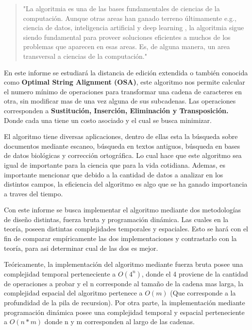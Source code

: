 

\begin{quote}
"La algoritmia es una de las
bases fundamentales de ciencias de la computación. Aunque otras areas
han ganado terreno últimamente e.g., ciencia de datos, inteligencia
artificial y deep learning , la algoritmia sigue siendo fundamental para
proveer soluciones eficientes a muchos de los problemas que aparecen
en esas areas. Es, de alguna manera, un area transversal a ciencias de
la computación."  \cite{algoritmos_discretos}
\end{quote}

En este informe se estudiará la distancia de edición 
extendida o también conocida como
\textbf{Optimal String Alignment (OSA)}, este algoritmo nos permite
calcular el numero mínimo de operaciones para transformar una cadena
de caracteres en otra, sin modificar mas de una vez alguna de sus subcadenas. Las operaciones corresponden a \textbf{Sustitución,
Inserción, Eliminación y Transposición.} Donde cada una tiene un costo
asociado y el cual se busca minimizar.

El algoritmo tiene diversas aplicaciones, dentro de ellas esta
la búsqueda sobre documentos mediante escaneo, búsqueda en textos antiguos,
búsqueda en bases de datos biológicas y corrección ortográfica. Lo cual
hace que este algoritmo sea igual de importante para la ciencia que para
la vida cotidiana. Ademas, es importante mencionar que debido a la cantidad
de datos a analizar en los distintos campos, la eficiencia del algoritmo
es algo que se ha ganado importancia a traves del tiempo.
\cite{algoritmos_discretos}

Con este informe se busca implementar el algoritmo mediante dos metodologías
de diseño distintas, fuerza bruta y programación dinámica. Las cuales en la
teoría, poseen distintas complejidades temporales y espaciales. Esto se hará
con el fin de comparar empíricamente las dos implementaciones y 
contrastarlo con la teoría, para asi determinar cual de las dos es mejor.

Teóricamente, la implementación del algoritmo mediante fuerza bruta 
posee una complejidad temporal perteneciente a \( O(4^n) \), donde el 4 proviene
de la cantidad de operaciones a probar y el n corresponde al tamaño de la cadena mas larga, la complejidad
espacial del algoritmo pertenece a \( O(m) \) (Que corresponde a la profundidad de la pila
de recursion). Por otra parte, la implementación mediante programación dinámica
posee una complejidad temporal y espacial perteneciente a \( O(n*m) \) donde n y m corresponden
al largo de las cadenas.

